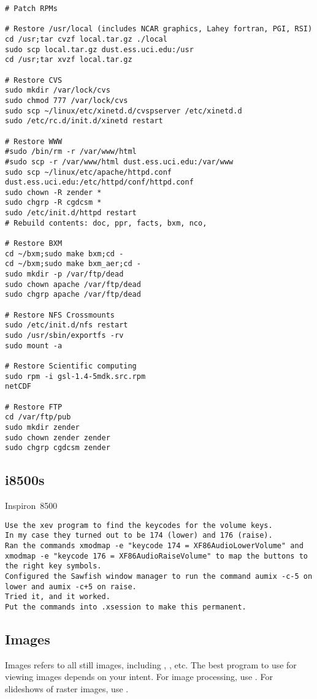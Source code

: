 \documentclass[12pt,twoside]{article}
\begin{document}
\begin{verbatim}
# Patch RPMs

# Restore /usr/local (includes NCAR graphics, Lahey fortran, PGI, RSI)
cd /usr;tar cvzf local.tar.gz ./local
sudo scp local.tar.gz dust.ess.uci.edu:/usr
cd /usr;tar xvzf local.tar.gz

# Restore CVS
sudo mkdir /var/lock/cvs
sudo chmod 777 /var/lock/cvs
sudo scp ~/linux/etc/xinetd.d/cvspserver /etc/xinetd.d
sudo /etc/rc.d/init.d/xinetd restart

# Restore WWW
#sudo /bin/rm -r /var/www/html
#sudo scp -r /var/www/html dust.ess.uci.edu:/var/www
sudo scp ~/linux/etc/apache/httpd.conf dust.ess.uci.edu:/etc/httpd/conf/httpd.conf
sudo chown -R zender *
sudo chgrp -R cgdcsm *
sudo /etc/init.d/httpd restart
# Rebuild contents: doc, ppr, facts, bxm, nco, 

# Restore BXM
cd ~/bxm;sudo make bxm;cd -
cd ~/bxm;sudo make bxm_aer;cd -
sudo mkdir -p /var/ftp/dead
sudo chown apache /var/ftp/dead
sudo chgrp apache /var/ftp/dead

# Restore NFS Crossmounts
sudo /etc/init.d/nfs restart
sudo /usr/sbin/exportfs -rv
sudo mount -a

# Restore Scientific computing
sudo rpm -i gsl-1.4-5mdk.src.rpm
netCDF

# Restore FTP
cd /var/ftp/pub
sudo mkdir zender
sudo chown zender zender
sudo chgrp cgdcsm zender
\end{verbatim}

\subsection{i8500s}\label{sxn:i8500}
Inspiron~8500
\begin{verbatim}
Use the xev program to find the keycodes for the volume keys. 
In my case they turned out to be 174 (lower) and 176 (raise).  
Ran the commands xmodmap -e "keycode 174 = XF86AudioLowerVolume" and
xmodmap -e "keycode 176 = XF86AudioRaiseVolume" to map the buttons to
the right key symbols.  
Configured the Sawfish window manager to run the command aumix -c-5 on
lower and aumix -c+5 on raise.  
Tried it, and it worked. 
Put the commands into .xsession to make this permanent. 
\end{verbatim}

\subsection{Images}\label{sxn:img}
Images refers to all still images, including ,
, etc. 
The best program to use for viewing images depends on your intent.
For image processing, use .
For slideshows of raster images, use .
\end{document}
